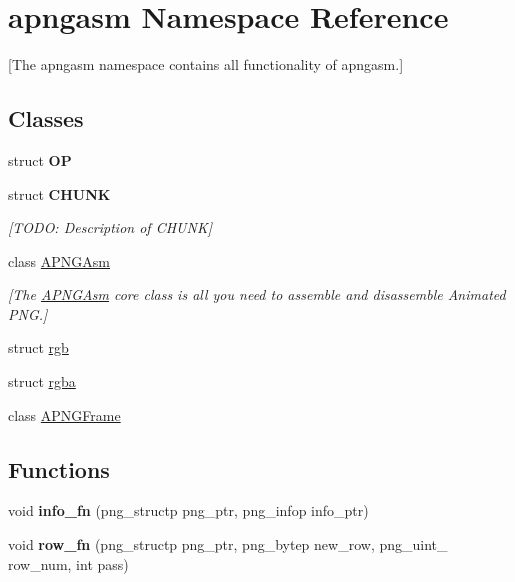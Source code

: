 \hypertarget{namespaceapngasm}{\section{apngasm Namespace Reference}
\label{namespaceapngasm}
}


\mbox{[}The apngasm namespace contains all functionality of apngasm.\mbox{]}  


\subsection*{Classes}
\begin{DoxyCompactItemize}
\item 
struct {\bfseries O\-P}
\item 
struct {\bfseries C\-H\-U\-N\-K}
\begin{DoxyCompactList}\small\item\em \mbox{[}T\-O\-D\-O\-: Description of C\-H\-U\-N\-K\mbox{]} \end{DoxyCompactList}\item 
class \hyperlink{classapngasm_1_1APNGAsm}{A\-P\-N\-G\-Asm}
\begin{DoxyCompactList}\small\item\em \mbox{[}The \hyperlink{classapngasm_1_1APNGAsm}{A\-P\-N\-G\-Asm} core class is all you need to assemble and disassemble Animated P\-N\-G.\mbox{]} \end{DoxyCompactList}\item 
struct \hyperlink{structapngasm_1_1rgb}{rgb}
\item 
struct \hyperlink{structapngasm_1_1rgba}{rgba}
\item 
class \hyperlink{classapngasm_1_1APNGFrame}{A\-P\-N\-G\-Frame}
\end{DoxyCompactItemize}
\subsection*{Functions}
\begin{DoxyCompactItemize}
\item 
\hypertarget{namespaceapngasm_a912714d1b2053741f74a32e0ff537a39}{void {\bfseries info\-\_\-fn} (png\-\_\-structp png\-\_\-ptr, png\-\_\-infop info\-\_\-ptr)}\label{namespaceapngasm_a912714d1b2053741f74a32e0ff537a39}

\item 
\hypertarget{namespaceapngasm_a8ae64735dbdfa76f608abbdd0050ba6e}{void {\bfseries row\-\_\-fn} (png\-\_\-structp png\-\_\-ptr, png\-\_\-bytep new\-\_\-row, png\-\_\-uint\-\_ row\-\_\-num, int pass)}\label{namespaceapngasm_a8ae64735dbdfa76f608abbdd0050ba6e}

\end{DoxyCompactItemize}
